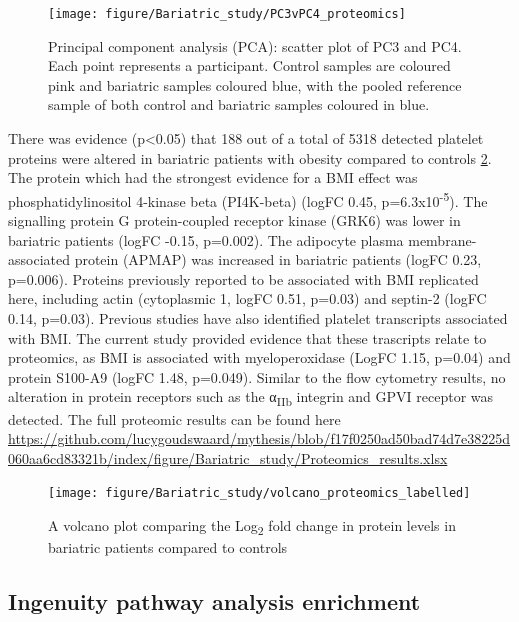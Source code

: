 \documentclass[11pt,twoside]{bristolthesis}
\begin{document}
\begin{figure}
\texttt{[image: figure/Bariatric\_study/PC3vPC4\_proteomics]} \caption[Principal component analysis (PCA): scatter plot of PC3 and PC4.]{Principal component analysis (PCA): scatter plot of PC3 and PC4. Each point represents a participant. Control samples are coloured pink and bariatric samples coloured blue, with the pooled reference sample of both control and bariatric samples coloured in blue.}\label{fig:pca2}
\end{figure}
There was evidence (p\textless0.05) that 188 out of a total of 5318 detected platelet proteins were altered in bariatric patients with obesity compared to controls \ref{fig:volcano}. The protein which had the strongest evidence for a BMI effect was phosphatidylinositol 4-kinase beta (PI4K-beta) (logFC 0.45, p=6.3x10\textsuperscript{-5}). The signalling protein G protein-coupled receptor kinase (GRK6) was lower in bariatric patients (logFC -0.15, p=0.002). The adipocyte plasma membrane-associated protein (APMAP) was increased in bariatric patients (logFC 0.23, p=0.006). Proteins previously reported to be associated with BMI replicated here, including actin (cytoplasmic 1, logFC 0.51, p=0.03) and septin-2 (logFC 0.14, p=0.03). Previous studies have also identified platelet transcripts associated with BMI. The current study provided evidence that these trascripts relate to proteomics, as BMI is associated with myeloperoxidase (LogFC 1.15, p=0.04) and protein S100-A9 (logFC 1.48, p=0.049). Similar to the flow cytometry results, no alteration in protein receptors such as the α\textsubscript{IIb} integrin and GPVI receptor was detected. The full proteomic results can be found here \url{https://github.com/lucygoudswaard/mythesis/blob/f17f0250ad50bad74d7e38225d060aa6cd83321b/index/figure/Bariatric_study/Proteomics_results.xlsx}



\begin{figure}
\texttt{[image: figure/Bariatric\_study/volcano\_proteomics\_labelled]} \caption[A volcano plot comparing the Log\textsubscript{2} fold change in protein levels in bariatric patients compared to controls]{A volcano plot comparing the Log\textsubscript{2} fold change in protein levels in bariatric patients compared to controls}\label{fig:volcano}
\end{figure}
\hypertarget{ingenuity-pathway-analysis-enrichment-1}{%
\subsection{Ingenuity pathway analysis enrichment}\label{ingenuity-pathway-analysis-enrichment-1}}
\end{document}
